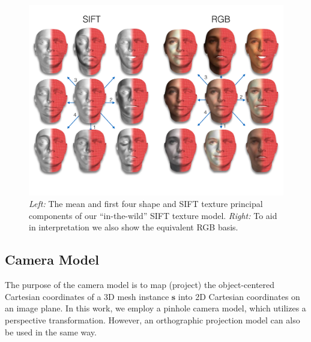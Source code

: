 \begin{figure}[!t]
    \centering
    \includegraphics[width=\linewidth]{basis}
    \caption{\emph{Left:} The mean and first four shape and SIFT texture principal components of our ``in-the-wild'' SIFT texture model. \emph{Right:} To aid in interpretation we also show the equivalent RGB basis.}
\label{fig:basis}
\end{figure}
%
%
%
\subsection{Camera Model}
The purpose of the camera model is to map (project) the object-centered Cartesian
coordinates of a 3D mesh instance $\mathbf{s}$ into 2D Cartesian coordinates on
an image plane. In this work, we employ a pinhole camera model, which utilizes a
perspective transformation. However, an orthographic projection model can also
be used in the same way.

